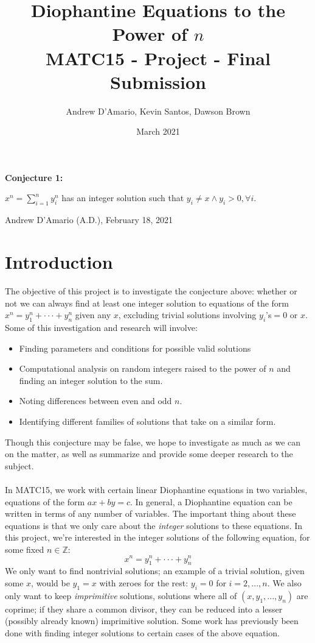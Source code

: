 \documentclass{article}
\title{Diophantine Equations to the Power of $n$ \\ \vspace{.3in} \large{MATC15 - Project - Final Submission}}
\author{Andrew D'Amario, Kevin Santos, Dawson Brown}
\date{March 2021}
\begin{document}
\maketitle

\begin{flushleft}
    {\bf Conjecture 1:}

    \hspace{.5in}$\displaystyle x^n=\sum^{n}_{i=1}y_i^n$ has an integer solution such that $y_i\ne x \land y_i > 0, \forall i$.

    \hspace{2in} Andrew D'Amario (A.D.), February 18, 2021

\section{Introduction}
The objective of this project is to investigate the conjecture above: whether or not we can always find at least one integer solution to equations of the form $x^n=y_1^n+\cdot\cdot\cdot+y_n^n$ given any $x$, excluding trivial solutions involving $y_i$'s$=0$ or $x$. \\
Some of this investigation and research will involve:
\begin{itemize}    
    \item Finding parameters and conditions for possible valid solutions
    \item Computational analysis on random integers raised to the power of $n$ and finding an integer solution to the sum.
    \item Noting differences between even and odd $n$.
    \item Identifying different families of solutions that take on a similar form.
\end{itemize}

Though this conjecture may be false, we hope to investigate as much as we can on the matter, as well as summarize and provide some deeper research to the subject. \\~\\

In MATC15, we work with certain linear Diophantine equations in two variables, equations of the form $ax+by=c$. In general, a Diophantine equation can be written in terms of any number of variables. The important thing about these equations is that we only care about the \textit{integer} solutions to these equations. In this project, we're interested in the integer solutions of the following equation, for some fixed $n \in \mathbb{Z}$:
\begin{equation}
    x^n=y_1^n+\cdot\cdot\cdot+y_n^n
\end{equation}
We only want to find nontrivial solutions; an example of a trivial solution, given some $x$, would be $y_1=x$ with zeroes for the rest: $y_i=0$ for $i=2, ..., n$. We also only want to keep \textit{imprimitive} solutions, solutions where all of $(x,y_1, ..., y_n)$ are coprime; if they share a common divisor, they can be reduced into a lesser (possibly already known) imprimitive solution. Some work has previously been done with finding integer solutions to certain cases of the above equation.\vspace{.1in}


\end{flushleft}
\end{document}
